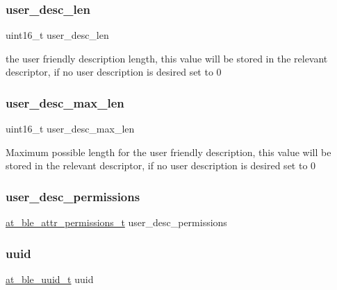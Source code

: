 \subsubsection{\texorpdfstring{user\_desc\_len}{user\_desc\_len}}
{\footnotesize\ttfamily uint16\+\_\+t user\+\_\+desc\+\_\+len}

the user friendly description length, this value will be stored in the relevant descriptor, if no user description is desired set to 0 \mbox{\label{structat__ble__characteristic__t_a1097a73ed510f3c33e3640e00aac3437}} 
\subsubsection{\texorpdfstring{user\_desc\_max\_len}{user\_desc\_max\_len}}
{\footnotesize\ttfamily uint16\+\_\+t user\+\_\+desc\+\_\+max\+\_\+len}

Maximum possible length for the user friendly description, this value will be stored in the relevant descriptor, if no user description is desired set to 0 \mbox{\label{structat__ble__characteristic__t_a4e7e0eada43a36e3023774eb0ea3f602}} 
\subsubsection{\texorpdfstring{user\_desc\_permissions}{user\_desc\_permissions}}
{\footnotesize\ttfamily \mbox{\hyperlink{at__ble__api_8h_a5d87cd231ea3f9e11846dba7cf75eb61}{at\+\_\+ble\+\_\+attr\+\_\+permissions\+\_\+t}} user\+\_\+desc\+\_\+permissions}

\mbox{\label{structat__ble__characteristic__t_a679a8e56540040619aee07eb7a743859}} 
\subsubsection{\texorpdfstring{uuid}{uuid}}
{\footnotesize\ttfamily \mbox{\hyperlink{structat__ble__uuid__t}{at\+\_\+ble\+\_\+uuid\+\_\+t}} uuid}

